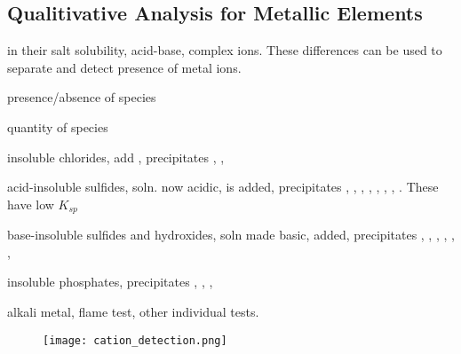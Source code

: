 \begin{mdframed}
\begin{multicols}{2}
\subsection{Qualitivative Analysis for Metallic Elements}
\begin{compactdesc}
\item[Metals vary] in their salt solubility, acid-base, complex ions.
    These differences can be used to separate and detect presence of metal
    ions.
\item[Qualitative analysis] presence/absence of species
\item[Quantitative analysis] quantity of species
\item[Common 5 group scheme]
    \begin{compactdesc}
    \item[Group 1] insoluble chlorides, add , precipitates
        , , 
    \item[Group 2] acid-insoluble sulfides, soln. now acidic,  is
        added, precipitates , , , ,
        , , , . These have low
        $K_{sp}$
    \item[Group 3] base-insoluble sulfides and hydroxides, soln made basic,
         added, precipitates , ,
        , , , ,
    \item[Group 4] insoluble phosphates,  precipitates
        , , , 
    \item[Group 5] alkali metal,  flame test, other individual tests.
    \end{compactdesc}
\end{compactdesc}

\begin{figure}[H]
    \centering
    \texttt{[image: cation\_detection.png]}
\end{figure}
\end{multicols}
\end{mdframed}






